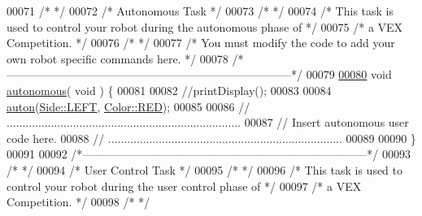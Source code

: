 \begin{DoxyCode}
{{{{{{{{{00071 \textcolor{comment}{/*                                                                           */}
00072 \textcolor{comment}{/*                              Autonomous Task                              */}
00073 \textcolor{comment}{/*                                                                           */}
00074 \textcolor{comment}{/*  This task is used to control your robot during the autonomous phase of   */}
00075 \textcolor{comment}{/*  a VEX Competition.                                                       */}
00076 \textcolor{comment}{/*                                                                           */}
00077 \textcolor{comment}{/*  You must modify the code to add your own robot specific commands here.   */}
00078 \textcolor{comment}{/*---------------------------------------------------------------------------*/}
00079 
\mbox{\hyperlink{main_8cpp_a2df3d06bc5bced154da27fce393f991f_a2df3d06bc5bced154da27fce393f991f}{00080}} \textcolor{keywordtype}{void} \mbox{\hyperlink{main_8cpp_a2df3d06bc5bced154da27fce393f991f_a2df3d06bc5bced154da27fce393f991f}{autonomous}}( \textcolor{keywordtype}{void} ) \{
00081 
00082   \textcolor{comment}{//printDisplay();}
00083 
00084   \mbox{\hyperlink{auton_8h_a9c7e58a3b4bb5cdd30a6b3ed32e8f962_a9c7e58a3b4bb5cdd30a6b3ed32e8f962}{auton}}(\mbox{\hyperlink{auton_8h_a702107095bd059695d57318e7338a4a7_a702107095bd059695d57318e7338a4a7a684d325a7303f52e64011467ff5c5758}{Side::LEFT}}, \mbox{\hyperlink{auton_8h_a78abb31bad0fd1834c54a3ca6f8daab5_a78abb31bad0fd1834c54a3ca6f8daab5aa2d9547b5d3dd9f05984475f7c926da0}{Color::RED}});
00085 
00086   \textcolor{comment}{// ..........................................................................}
00087   \textcolor{comment}{// Insert autonomous user code here.}
00088   \textcolor{comment}{// ..........................................................................}
00089 
00090 \}
00091 
00092 \textcolor{comment}{/*---------------------------------------------------------------------------*/}
00093 \textcolor{comment}{/*                                                                           */}
00094 \textcolor{comment}{/*                              User Control Task                            */}
00095 \textcolor{comment}{/*                                                                           */}
00096 \textcolor{comment}{/*  This task is used to control your robot during the user control phase of */}
00097 \textcolor{comment}{/*  a VEX Competition.                                                       */}
00098 \textcolor{comment}{/*                                                                           */}
}}}}}}}}}
\end{DoxyCode}
